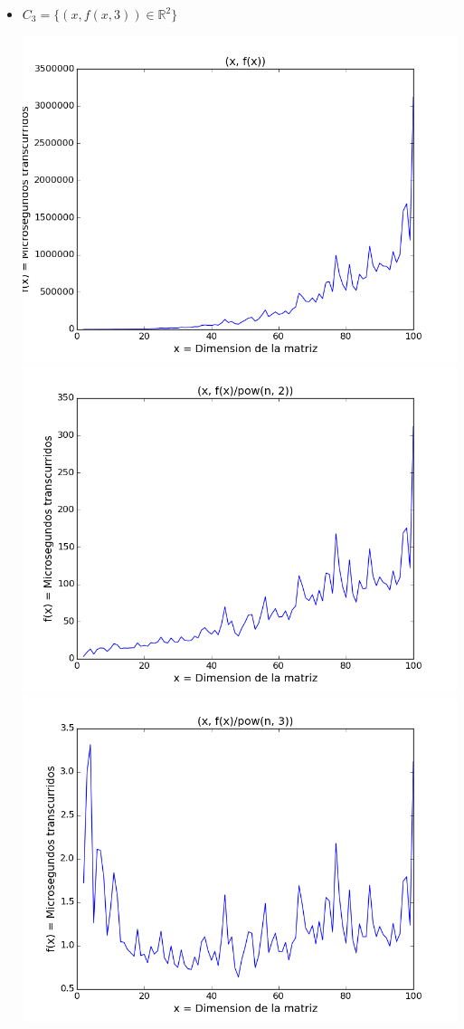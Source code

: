 \begin{itemize}
	\item $C_3 = \{ (x, f(x, 3)) \in \mathbb{R}^2 \}$
	\begin{center}
		\includegraphics[scale=0.54]{images/3potenciafuncion}
		\includegraphics[scale=0.54]{images/3potenciasobrecuadrado}
		\includegraphics[scale=0.54]{images/3potenciasobrecubo}
	\end{center}


\end{itemize}

